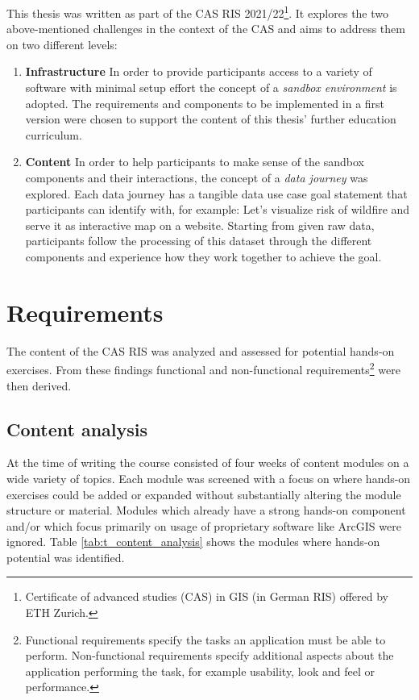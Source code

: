 \documentclass[11pt, a4paper, oneside, parskip=full-]{scrartcl}
\begin{document}
This thesis was written as part of the CAS RIS 2021/22\footnote{Certificate of
advanced studies (CAS) in GIS (in German RIS) offered by ETH Zurich.}. It
explores the two above-mentioned challenges in the context of the CAS and aims
to address them on two different levels:
\begin{enumerate}
  \item \textbf{Infrastructure} In order to provide participants access to a
  variety of software with minimal setup effort the concept of a \emph{sandbox
  environment} is adopted. The requirements and components to be implemented in
  a first version were chosen to support the content of this thesis' further
  education curriculum.
  \item \textbf{Content} In order to help participants to make sense of the
  sandbox components and their interactions, the concept of a \emph{data
  journey} was explored. Each data journey has a tangible data use case goal
  statement that participants can identify with, for example: Let's visualize
  risk of wildfire and serve it as interactive map on a website. Starting from
  given raw data, participants follow the processing of this dataset through the
  different components and experience how they work together to achieve the
  goal.
\end{enumerate}


\section{Requirements}
The content of the CAS RIS was analyzed and assessed for potential hands-on
exercises. From these findings functional and non-functional
requirements\footnote{Functional requirements specify the tasks an application
must be able to perform. Non-functional requirements specify additional aspects
about the application performing the task, for example usability, look and feel
or performance. } were then derived.

\subsection{Content analysis}
At the time of writing the course consisted of four weeks of content modules on
a wide variety of topics. Each module was screened with a focus on where
hands-on exercises could be added or expanded without substantially altering the
module structure or material. Modules which already have a strong hands-on
component and/or which focus primarily on usage of proprietary software like
ArcGIS were ignored. Table \ref{tab:t_content_analysis} shows the modules where
hands-on potential was identified.
\end{document}
